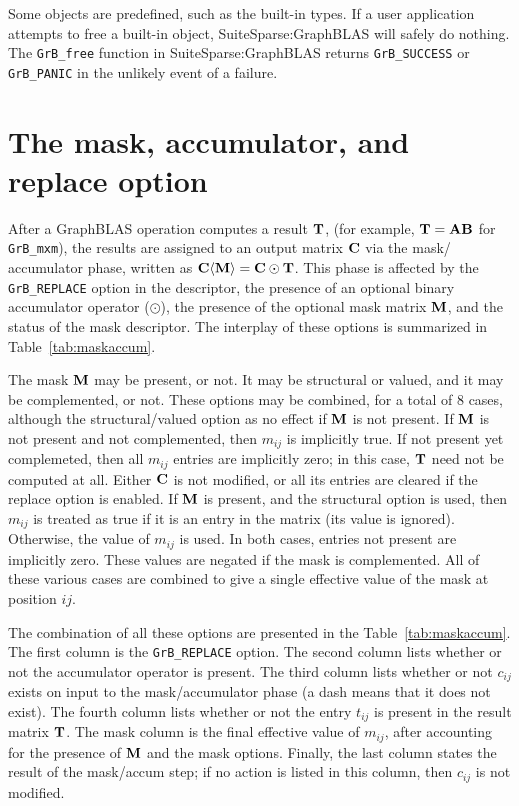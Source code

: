 \documentclass[12pt]{article}
\begin{document}
Some objects are predefined, such as the built-in types.  If a user application
attempts to free a built-in object, SuiteSparse:GraphBLAS will safely do
nothing.  The \verb'GrB_free' function in SuiteSparse:GraphBLAS returns
\verb'GrB_SUCCESS' or \verb'GrB_PANIC' in the unlikely event of a failure.

\newpage
\section{The mask, accumulator, and replace option} %
\label{sec:maskaccum}

After a GraphBLAS operation computes a result ${\bf T}$, (for example, ${\bf
T=AB}$ for \verb'GrB_mxm'), the results are assigned to an output matrix ${\bf
C}$ via the mask/ accumulator phase, written as ${\bf C \langle M \rangle = C
\odot T}$.  This phase is affected by the \verb'GrB_REPLACE' option in the
descriptor, the presence of an optional binary accumulator operator ($\odot$),
the presence of the optional mask matrix ${\bf M}$, and the status of the mask
descriptor.  The interplay of these options is summarized in
Table~\ref{tab:maskaccum}.

The mask ${\bf M}$ may be present, or not.  It may be structural or valued, and
it may be complemented, or not.  These options may be combined, for a total of
8 cases, although the structural/valued option as no effect if ${\bf M}$ is not
present.  If ${\bf M}$ is not present and not complemented, then $m_{ij}$ is
implicitly true.  If not present yet complemeted, then all $m_{ij}$ entries are
implicitly zero; in this case, ${\bf T}$ need not be computed at all.  Either
${\bf C}$ is not modified, or all its entries are cleared if the replace option
is enabled.  If ${\bf M}$ is present, and the structural option is used, then
$m_{ij}$ is treated as true if it is an entry in the matrix (its value is
ignored).  Otherwise, the value of $m_{ij}$ is used.  In both cases, entries
not present are implicitly zero.  These values are negated if the mask is
complemented.  All of these various cases are combined to give a single
effective value of the mask at position ${ij}$.

The combination of all these options are presented in the
Table~\ref{tab:maskaccum}.  The first column is the \verb'GrB_REPLACE' option.
The second column lists whether or not the accumulator operator is present.
The third column lists whether or not $c_{ij}$ exists on input to the
mask/accumulator phase (a dash means that it does not exist).  The fourth
column lists whether or not the entry $t_{ij}$ is present in the result matrix
${\bf T}$.  The mask column is the final effective value of $m_{ij}$, after
accounting for the presence of ${\bf M}$ and the mask options.  Finally, the
last column states the result of the mask/accum step; if no action is listed in
this column, then $c_{ij}$ is not modified.
\end{document}
